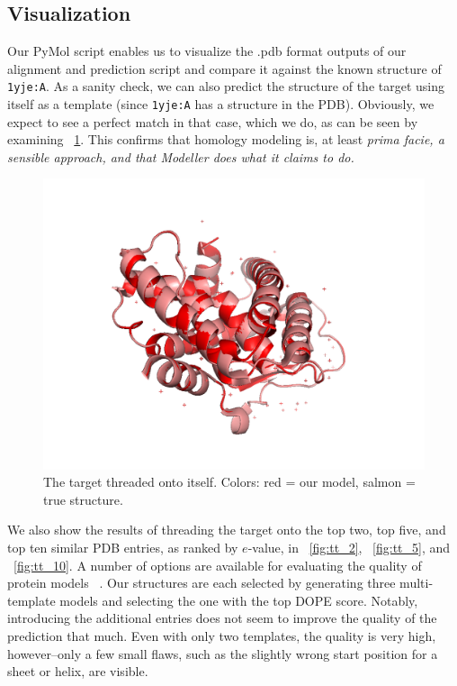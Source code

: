 \documentclass[]{report}   %
\begin{document}
\subsection*{Visualization}   

Our PyMol script enables us to visualize the .pdb format outputs of our alignment and prediction script and compare it against the known structure of \texttt{1yje:A}. As a sanity check, we can also predict the structure of the target using itself as a template (since \texttt{1yje:A} has a structure in the PDB). Obviously, we expect to see a perfect match in that case, which we do, as can be seen by examining \figurename~\ref{fig:truevtrue}. This confirms that homology modeling is, at least \it{prima facie}\rm, a sensible approach, and that Modeller does what it claims to do.

\begin{figure}[h!]
\begin{center}
  \includegraphics[width=0.8\linewidth]{real_vs_real.png}
\caption{The target threaded onto itself. Colors: red = our model, salmon = true structure.}
\label{fig:truevtrue}
\end{center}
\end{figure}

We also show the results of threading the target onto the top two, top five, and top ten similar PDB entries, as ranked by $e$-value, in \figurename~\ref{fig:tt_2}, \figurename~\ref{fig:tt_5}, and \figurename~\ref{fig:tt_10}. A number of options are available for evaluating the quality of protein models ~\cite{krysh}. Our structures are each selected by generating three multi-template models and selecting the one with the top DOPE score. Notably, introducing the additional entries does not seem to improve the quality of the prediction that much. Even with only two templates, the quality is very high, however–only a few small flaws, such as the slightly wrong start position for a sheet or helix, are visible.
\end{document}
